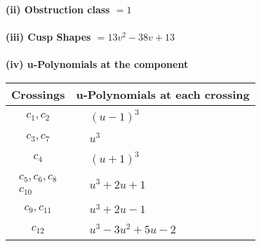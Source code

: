\documentclass[1p]{elsarticle_modified}
\theoremstyle{definition}
\begin{document}
\flushleft \textbf{(ii) Obstruction class $= 1$}\\~\\
\flushleft \textbf{(iii) Cusp Shapes $= 13 v^2-38 v+13$}\\~\\
\newpage\renewcommand{\arraystretch}{1}
\flushleft \textbf{(iv) u-Polynomials at the component}\newline \\
\begin{tabular}{m{50pt}|m{274pt}}
Crossings & \hspace{64pt}u-Polynomials at each crossing \\
\hline $$\begin{aligned}c_{1},c_{2}\end{aligned}$$&$\begin{aligned}
&(u-1)^3
\end{aligned}$\\
\hline $$\begin{aligned}c_{3},c_{7}\end{aligned}$$&$\begin{aligned}
&u^3
\end{aligned}$\\
\hline $$\begin{aligned}c_{4}\end{aligned}$$&$\begin{aligned}
&(u+1)^3
\end{aligned}$\\
\hline $$\begin{aligned}c_{5},c_{6},c_{8}\\c_{10}\end{aligned}$$&$\begin{aligned}
&u^3+2 u+1
\end{aligned}$\\
\hline $$\begin{aligned}c_{9},c_{11}\end{aligned}$$&$\begin{aligned}
&u^3+2 u-1
\end{aligned}$\\
\hline $$\begin{aligned}c_{12}\end{aligned}$$&$\begin{aligned}
&u^3-3 u^2+5 u-2
\end{aligned}$\\
\hline
\end{tabular}\\~\\
\end{document}

